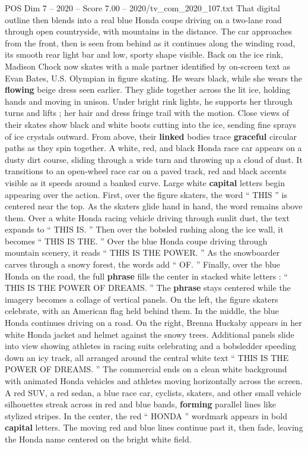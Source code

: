 \begin{textsample}{POS Dim 7 – 2020 – Score 7.00 – 2020/tv\_com\_2020\_107.txt}
That digital outline then blends into a real blue Honda coupe driving on a two-lane road through open countryside, with mountains in the distance.
The car approaches from the front, then is seen from behind as it continues along the winding road, its smooth rear light bar and low, sporty shape visible.
Back on the ice rink, Madison Chock now skates with a male partner identified by on-screen text as Evan Bates, U.S.
Olympian in figure skating.
He wears black, while she wears the \textbf{flowing} beige dress seen earlier.
They glide together across the lit ice, holding hands and moving in unison.
Under bright rink lights, he supports her through turns and lifts ; her hair and dress fringe trail with the motion.
Close views of their skates show black and white boots cutting into the ice, sending fine sprays of ice crystals outward.
From above, their \textbf{linked} bodies trace \textbf{graceful} circular paths as they spin together.
A white, red, and black Honda race car appears on a dusty dirt course, sliding through a wide turn and throwing up a cloud of dust.
It transitions to an open-wheel race car on a paved track, red and black accents visible as it speeds around a banked curve.
Large white \textbf{capital} letters begin appearing over the action.
First, over the figure skaters, the word “ THIS ” is centered near the top.
As the skaters glide hand in hand, the word remains above them.
Over a white Honda racing vehicle driving through sunlit dust, the text expands to “ THIS IS. ” Then over the bobsled rushing along the ice wall, it becomes “ THIS IS THE. ” Over the blue Honda coupe driving through mountain scenery, it reads “ THIS IS THE POWER. ” As the snowboarder carves through a snowy forest, the words add “ OF. ” Finally, over the blue Honda on the road, the full \textbf{phrase} fills the center in stacked white letters : “ THIS IS THE POWER OF DREAMS. ” The \textbf{phrase} stays centered while the imagery becomes a collage of vertical panels.
On the left, the figure skaters celebrate, with an American flag held behind them.
In the middle, the blue Honda continues driving on a road.
On the right, Brenna Huckaby appears in her white Honda jacket and helmet against the snowy trees.
Additional panels slide into view showing athletes in racing suits celebrating and a bobsledder speeding down an icy track, all arranged around the central white text “ THIS IS THE POWER OF DREAMS. ” The commercial ends on a clean white background with animated Honda vehicles and athletes moving horizontally across the screen.
A red SUV, a red sedan, a blue race car, cyclists, skaters, and other small vehicle silhouettes streak across in red and blue bands, \textbf{forming} parallel lines like stylized stripes.
In the center, the red “ HONDA ” wordmark appears in bold \textbf{capital} letters.
The moving red and blue lines continue past it, then fade, leaving the Honda name centered on the bright white field.

\end{textsample}
